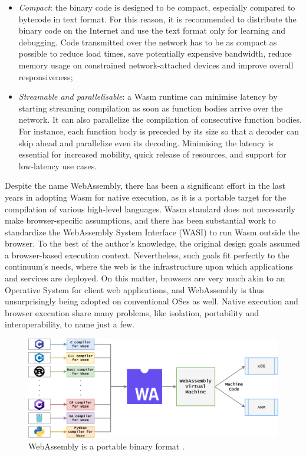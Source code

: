 \begin{itemize}
    \item \emph{Compact}: the binary code is designed to be compact, especially compared to bytecode in text format. For this reason, it is recommended to distribute the binary code on the Internet and use the text format only for learning and debugging. Code transmitted over the network has to be as compact as possible to reduce load times, save potentially expensive bandwidth, reduce memory usage on constrained network-attached devices and improve overall responsiveness;
    \item \emph{Streamable and parallelisable}: a Wasm runtime can minimise latency by starting streaming compilation as soon as function bodies arrive over the network. It can also parallelize the compilation of consecutive function bodies. For instance, each function body is preceded by its size so that a decoder can skip ahead and parallelize even its decoding. Minimising the latency is essential for increased mobility, quick release of resources, and support for low-latency use cases.
\end{itemize}

Despite the name WebAssembly, there has been a significant effort in the last years in adopting Wasm for native execution, as it is a portable target for the compilation of various high-level languages. Wasm standard does not necessarily make browser-specific assumptions, and there has been substantial work to standardize the WebAssembly System Interface (WASI) to run Wasm outside the browser. To the best of the author's knowledge, the original design goals assumed a browser-based execution context. Nevertheless, such goals fit perfectly to the continuum's needs, where the web is the infrastructure upon which applications and services are deployed. On this matter, browsers are very much akin to an Operative System for client web applications, and WebAssembly is thus unsurprisingly being adopted on conventional OSes as well. Native execution and browser execution share many problems, like isolation, portability and interoperability, to name just a few.

\begin{figure}[ht]
\centering
\includegraphics[width=\columnwidth]{figures/portability}
\caption{WebAssembly is a portable binary format \label{fig:portability}.}
\end{figure}

